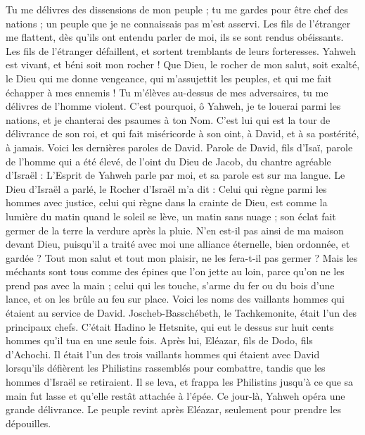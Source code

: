 \begin{multicols}{2}
Tu me délivres des dissensions de mon peuple ; tu me gardes pour être chef des nations ; un peuple que je ne connaissais pas m'est asservi.
Les fils de l'étranger me flattent, dès qu'ils ont entendu parler de moi, ils se sont rendus obéissants.
Les fils de l'étranger défaillent, et sortent tremblants de leurs forteresses.
Yahweh est vivant, et béni soit mon rocher ! Que Dieu, le rocher de mon salut, soit exalté,
le Dieu qui me donne vengeance, qui m'assujettit les peuples,
et qui me fait échapper à mes ennemis ! Tu m'élèves au-dessus de mes adversaires, tu me délivres de l'homme violent.
C'est pourquoi, ô Yahweh, je te louerai parmi les nations, et je chanterai des psaumes à ton Nom.
C'est lui qui est la tour de délivrance de son roi, et qui fait miséricorde à son oint, à David, et à sa postérité, à jamais.
\VerseOne{}Voici les dernières paroles de David. Parole de David, fils d'Isaï, parole de l'homme qui a été élevé, de l'oint du Dieu de Jacob, du chantre agréable d'Israël :
L'Esprit de Yahweh parle par moi, et sa parole est sur ma langue.
Le Dieu d'Israël a parlé, le Rocher d'Israël m'a dit : Celui qui règne parmi les hommes avec justice, celui qui règne dans la crainte de Dieu,
est comme la lumière du matin quand le soleil se lève, un matin sans nuage ; son éclat fait germer de la terre la verdure après la pluie.
N'en est-il pas ainsi de ma maison devant Dieu, puisqu'il a traité avec moi une alliance éternelle, bien ordonnée, et gardée ? Tout mon salut et tout mon plaisir, ne les fera-t-il pas germer ?
Mais les méchants sont tous comme des épines que l'on jette au loin, parce qu'on ne les prend pas avec la main ;
celui qui les touche, s'arme du fer ou du bois d'une lance, et on les brûle au feu sur place.
Voici les noms des vaillants hommes qui étaient au service de David. Joscheb-Basschébeth, le Tachkemonite, était l'un des principaux chefs. C'était Hadino le Hetsnite, qui eut le dessus sur huit cents hommes qu'il tua en une seule fois.
Après lui, Eléazar, fils de Dodo, fils d'Achochi. Il était l'un des trois vaillants hommes qui étaient avec David lorsqu'ils défièrent les Philistins rassemblés pour combattre, tandis que les hommes d'Israël se retiraient.
Il se leva, et frappa les Philistins jusqu'à ce que sa main fut lasse et qu'elle restât attachée à l'épée. Ce jour-là, Yahweh opéra une grande délivrance. Le peuple revint après Eléazar, seulement pour prendre les dépouilles.

\end{multicols}
